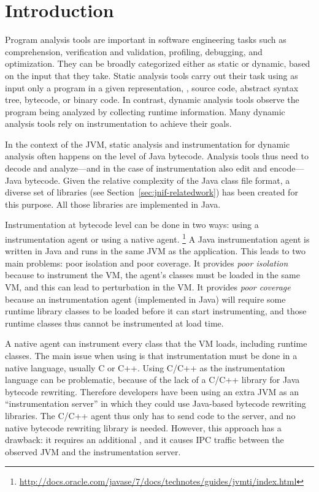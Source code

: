 \section{Introduction}
\label{sec:jnif-introduction}

Program analysis tools are important in software engineering tasks 
such as comprehension, verification and validation, profiling, debugging, and optimization.
They can be broadly categorized either as static or dynamic,
based on the input that they take.
Static analysis tools carry out their task using as input only a program
in a given representation, \eg{}, source code, abstract syntax tree,
bytecode, or binary code.
In contrast, dynamic analysis tools observe the program being analyzed 
by collecting runtime information.
Many dynamic analysis tools rely on instrumentation to achieve their goals.

In the context of the JVM, 
static analysis and instrumentation for dynamic analysis often happens on the level of Java bytecode.
Analysis tools thus need to decode and analyze---and in the case of instrumentation also edit and encode---Java bytecode.
Given the relative complexity of the Java class file format,
a diverse set of libraries (see Section~\ref{sec:jnif-relatedwork}) has been created for this purpose.
All those libraries are implemented in Java.

Instrumentation at bytecode level can be done in two ways:
using a \java{} instrumentation agent or using a native \jvmti{} agent.%
\footnote{\url{http://docs.oracle.com/javase/7/docs/technotes/guides/jvmti/index.html}}
A Java instrumentation agent is written in Java and runs in the same JVM as the application.
This leads to two main problems: poor isolation and poor coverage.
It provides \emph{poor isolation} because to instrument the VM, 
the agent's classes must be loaded in the same VM,
and this can lead to perturbation in the VM.
It provides \emph{poor coverage} because 
an instrumentation agent (implemented in Java) will require some runtime library classes to be loaded before it can start instrumenting,
and those runtime classes thus cannot be instrumented at load time. 

A native \jvmti{} agent can instrument every class that the VM loads, including runtime classes. 
The main issue when using \jvmti{} is that instrumentation must be done in a native language, usually C or C++. 
Using C/C++ as the instrumentation language can be problematic, 
because of the lack of a C/C++ library for Java bytecode rewriting. 
Therefore developers have been using an extra JVM as an ``instrumentation server''
in which they could use Java-based bytecode rewriting libraries.
The C/C++ \jvmti{} agent thus only has to send code to the server,
and no native bytecode rewriting library is needed.
However, this approach has a drawback: it requires an additional \jvm{}, 
and it causes IPC traffic between the observed JVM and the instrumentation server.


